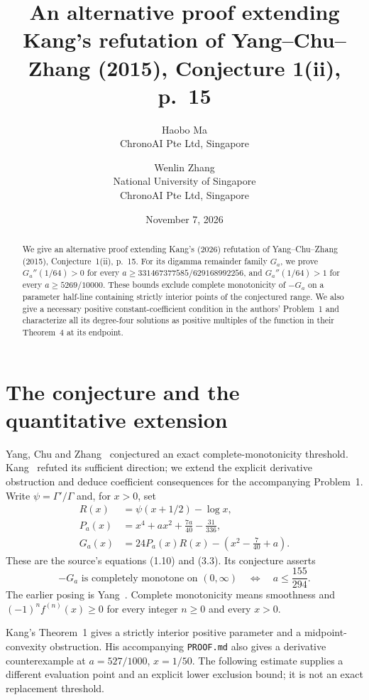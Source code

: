 \documentclass[11pt]{article}
\title{An alternative proof extending Kang's refutation of
Yang--Chu--Zhang (2015), Conjecture 1(ii), p.~15}
\author{Haobo Ma\\\small ChronoAI Pte Ltd, Singapore
\and Wenlin Zhang\\\small National University of Singapore\\
\small ChronoAI Pte Ltd, Singapore}
\date{November 7, 2026}
\begin{document}
\maketitle
\begin{abstract}
We give an alternative proof extending Kang's (2026) refutation of
Yang--Chu--Zhang (2015), Conjecture~1(ii), p.~15.
For its digamma remainder family $G_a$, we prove $G_a''(1/64)>0$
for every $a\geq331467377585/629168992256$, and $G_a''(1/64)>1$
for every $a\geq5269/10000$.
These bounds exclude complete monotonicity of $-G_a$ on a parameter
half-line containing strictly interior points of the conjectured range.
We also give a necessary positive constant-coefficient condition in the
authors' Problem~1 and characterize all its degree-four solutions as
positive multiples of the function in their Theorem~4 at its endpoint.
\end{abstract}

\section{The conjecture and the quantitative extension}
Yang, Chu and Zhang~\cite[Conjecture~1(ii), p.~15]{ycz} conjectured an
exact complete-monotonicity threshold. Kang~\cite{kang} refuted its
sufficient direction; we extend the explicit derivative obstruction and
deduce coefficient consequences for the accompanying Problem~1.
Write $\psi=\Gamma'/\Gamma$ and, for $x>0$, set
\begin{align}
R(x)&=\psi(x+1/2)-\log x,\label{eq:R}\\
P_a(x)&=x^4+ax^2+\frac{7a}{40}-\frac{31}{336},\nonumber\\
G_a(x)&=24P_a(x)R(x)-\left(x^2-\frac7{40}+a\right).
\label{eq:G}
\end{align}
These are the source's equations (1.10) and (3.3). Its conjecture asserts
\begin{equation}
-G_a\text{ is completely monotone on }(0,\infty)
\quad\Longleftrightarrow\quad a\leq\frac{155}{294}.
\label{eq:claim}
\end{equation}
The earlier posing is Yang~\cite[Conjecture~1(ii), p.~14]{yang}.
Complete monotonicity means smoothness and
$(-1)^nf^{(n)}(x)\geq0$ for every integer $n\geq0$ and every $x>0$.

Kang's Theorem~1 gives a strictly interior positive parameter and a
midpoint-convexity obstruction. His accompanying \texttt{PROOF.md}
also gives a derivative counterexample at $a=527/1000$, $x=1/50$.
The following estimate supplies a different evaluation point and an
explicit lower exclusion bound; it is not an exact replacement threshold.
\end{document}

